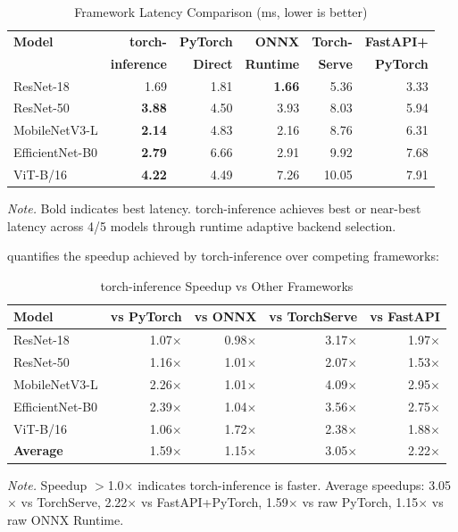 \documentclass[10pt,twocolumn,a4paper]{article}
\theoremstyle{definition}
\theoremstyle{plain}
\newcommand{\timesX}[1]{#1$\times$}
\begin{document}
\begin{table}[t]
\centering
\caption{Framework Latency Comparison (ms, lower is better)}
\label{tab:framework_latency}
\scriptsize
\setlength{\tabcolsep}{2.5pt}
\begin{tabular}{@{}lrrrrr@{}}
\toprule
\textbf{Model} & \textbf{torch-} & \textbf{PyTorch} & \textbf{ONNX} & \textbf{Torch-} & \textbf{FastAPI+} \\
 & \textbf{inference} & \textbf{Direct} & \textbf{Runtime} & \textbf{Serve} & \textbf{PyTorch} \\
\midrule
ResNet-18 & 1.69 & 1.81 & \textbf{1.66} & 5.36 & 3.33 \\
ResNet-50 & \textbf{3.88} & 4.50 & 3.93 & 8.03 & 5.94 \\
MobileNetV3-L & \textbf{2.14} & 4.83 & 2.16 & 8.76 & 6.31 \\
EfficientNet-B0 & \textbf{2.79} & 6.66 & 2.91 & 9.92 & 7.68 \\
ViT-B/16 & \textbf{4.22} & 4.49 & 7.26 & 10.05 & 7.91 \\
\bottomrule
\end{tabular}

\vspace{0.5em}
\noindent\textit{Note.} Bold indicates best latency. torch-inference achieves best or near-best latency across 4/5 models through runtime adaptive backend selection.
\end{table}

 quantifies the speedup achieved by torch-inference over competing frameworks:

\begin{table}[t]
\centering
\caption{torch-inference Speedup vs Other Frameworks}
\label{tab:framework_speedup}
\scriptsize
\setlength{\tabcolsep}{4pt}
\begin{tabular}{@{}lrrrr@{}}
\toprule
\textbf{Model} & \textbf{vs PyTorch} & \textbf{vs ONNX} & \textbf{vs TorchServe} & \textbf{vs FastAPI} \\
\midrule
ResNet-18 & \timesX{1.07} & \timesX{0.98} & \timesX{3.17} & \timesX{1.97} \\
ResNet-50 & \timesX{1.16} & \timesX{1.01} & \timesX{2.07} & \timesX{1.53} \\
MobileNetV3-L & \timesX{2.26} & \timesX{1.01} & \timesX{4.09} & \timesX{2.95} \\
EfficientNet-B0 & \timesX{2.39} & \timesX{1.04} & \timesX{3.56} & \timesX{2.75} \\
ViT-B/16 & \timesX{1.06} & \timesX{1.72} & \timesX{2.38} & \timesX{1.88} \\
\midrule
\textbf{Average} & \timesX{1.59} & \timesX{1.15} & \timesX{3.05} & \timesX{2.22} \\
\bottomrule
\end{tabular}

\vspace{0.5em}
\noindent\textit{Note.} Speedup $>$\timesX{1.0} indicates torch-inference is faster. Average speedups: \timesX{3.05} vs TorchServe, \timesX{2.22} vs FastAPI+PyTorch, \timesX{1.59} vs raw PyTorch, \timesX{1.15} vs raw ONNX Runtime.
\end{table}
\end{document}
